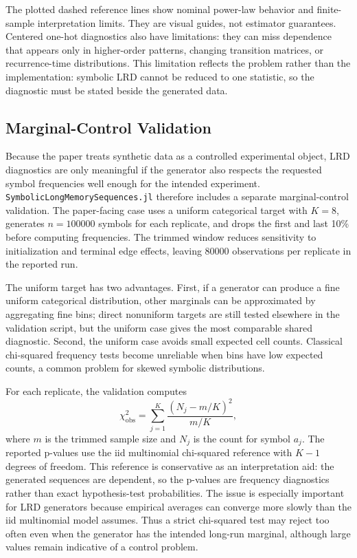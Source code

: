 \documentclass[journal]{IEEEtran}
\newcommand{\pkg}[1]{\texttt{#1}}
\newcommand{\sfive}{\pkg{SymbolicLongMemorySequences.jl}}
\begin{document}
The plotted dashed reference lines show nominal power-law behavior and
finite-sample interpretation limits.  They are visual guides, not estimator
guarantees.  Centered one-hot diagnostics also have limitations: they can miss
dependence that appears only in higher-order patterns, changing transition
matrices, or recurrence-time distributions.  This limitation reflects the problem rather than the implementation: symbolic
LRD cannot be reduced to one statistic, so the diagnostic must be stated beside
the generated data.

\subsection{Marginal-Control Validation}

Because the paper treats synthetic data as a controlled experimental object,
LRD diagnostics are only meaningful if the generator also respects the requested
symbol frequencies well enough for the intended experiment. \sfive{} therefore
includes a separate marginal-control validation. The paper-facing case uses a
uniform categorical target with \(K=8\), generates \(n=100000\) symbols for each
replicate, and drops the first and last 10\% before computing frequencies. The
trimmed window reduces sensitivity to initialization and terminal edge effects,
leaving 80000 observations per replicate in the reported run.

The uniform target has two advantages. First, if a generator can produce a
fine uniform categorical distribution, other marginals can be approximated by
aggregating fine bins; direct nonuniform targets are still tested elsewhere in
the validation script, but the uniform case gives the most comparable shared
diagnostic.
Second, the uniform case avoids small expected cell counts. Classical
chi-squared frequency tests become unreliable when bins have low expected
counts, a common problem for skewed symbolic distributions.

For each replicate, the validation computes
\begin{equation}
  \chi^2_{\mathrm{obs}} = \sum_{j=1}^{K}\frac{(N_j - m/K)^2}{m/K},
\end{equation}
where \(m\) is the trimmed sample size and \(N_j\) is the count for symbol
\(a_j\). The reported p-values use the iid multinomial chi-squared reference
with \(K-1\) degrees of freedom. This reference is conservative as
an interpretation aid: the generated sequences are dependent, so the p-values
are frequency diagnostics rather than exact hypothesis-test probabilities. The
issue is especially important for LRD generators because empirical averages can
converge more slowly than the iid multinomial model assumes. Thus a strict
chi-squared test may reject too often even when the generator has the intended
long-run marginal, although large values remain indicative of a control problem.
\end{document}

